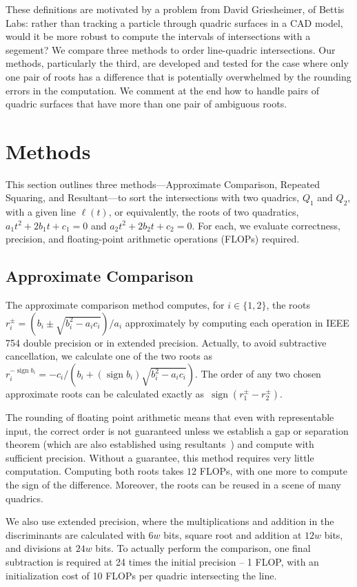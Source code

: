 \documentclass{cccg16}
\DeclareMathOperator{\sign}{sign}
\begin{document}
These definitions are motivated by a problem from David Griesheimer,
of Bettis Labs: rather than tracking a particle through quadric
surfaces in a CAD model, would it be more robust to compute the
intervals of intersections with a segement?  We compare three methods
to order line-quadric intersections.  Our methods, particularly the
third, are  developed and tested for the case where only
one pair of roots has a difference that is potentially overwhelmed by
the rounding errors in the computation. We comment at the end how to
handle pairs of quadric surfaces that have more than one pair of
ambiguous roots.


\section{Methods}
This section outlines three methods---Approximate Comparison, Repeated
Squaring, and Resultant---to sort the intersections with two quadrics,
$Q_1$ and $Q_2$, with a given line $\ell(t)$, or equivalently, the
roots of two quadratics, $a_1t^2+2b_1t+c_1=0$ and
$a_2t^2+2b_2t+c_2=0$.  For each, we evaluate correctness, precision,
and floating-point arithmetic operations (FLOPs) required.

\subsection{Approximate Comparison}
The approximate comparison method computes, for $i\in\{1, 2\}$, the
roots~$r_i^\pm=({b_i\pm\sqrt{b_i^2-a_ic_i}})/{a_i}$ approximately by
computing each operation in IEEE 754 double precision or in extended
precision.  Actually, to avoid subtractive cancellation, we calculate
one of the two roots as $r_i^{-\sign
  b_i}=-c_i/({b_i+(\sign{b_i})\sqrt{b_i^2-a_ic_i}})$.  The order of
any two chosen approximate roots can be calculated exactly
as~$\sign(r_1^\pm-r_2^\pm)$.

The rounding of floating point arithmetic means that even with
representable input, the correct order is not guaranteed unless we
establish a gap or separation theorem (which are also established
using resultants~\cite{brownawell2009lower,emiris2010dmm}) and compute with sufficient
precision.  Without a guarantee, this method requires very little
computation.  Computing both roots takes $12$ FLOPs, with one more to
compute the sign of the difference.  Moreover, the roots can be reused
in a scene of many quadrics.

We also use extended precision, where the multiplications and addition
in the discriminants are calculated with $6w$ bits, square root and
addition at $12w$ bits, and divisions at $24w$ bits.  To actually
perform the comparison, one final subtraction is required at 24 times
the initial precision -- 1 FLOP, with an initialization cost of 10
FLOPs per quadric intersecting the line.
\end{document}
